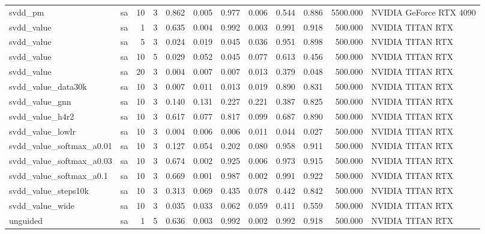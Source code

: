 \begin{tabular}{llrrrrrrrrrl}
svdd_pm & sa & 10 & 3 & 0.862 & 0.005 & 0.977 & 0.006 & 0.544 & 0.886 & 5500.000 & NVIDIA GeForce RTX 4090 \\
svdd_value & sa & 1 & 3 & 0.635 & 0.004 & 0.992 & 0.003 & 0.991 & 0.918 & 500.000 & NVIDIA TITAN RTX \\
svdd_value & sa & 5 & 3 & 0.024 & 0.019 & 0.045 & 0.036 & 0.951 & 0.898 & 500.000 & NVIDIA TITAN RTX \\
svdd_value & sa & 10 & 5 & 0.029 & 0.052 & 0.045 & 0.077 & 0.613 & 0.456 & 500.000 & NVIDIA TITAN RTX \\
svdd_value & sa & 20 & 3 & 0.004 & 0.007 & 0.007 & 0.013 & 0.379 & 0.048 & 500.000 & NVIDIA TITAN RTX \\
svdd_value_data30k & sa & 10 & 3 & 0.007 & 0.011 & 0.013 & 0.019 & 0.890 & 0.831 & 500.000 & NVIDIA TITAN RTX \\
svdd_value_gnn & sa & 10 & 3 & 0.140 & 0.131 & 0.227 & 0.221 & 0.387 & 0.825 & 500.000 & NVIDIA TITAN RTX \\
svdd_value_h4r2 & sa & 10 & 3 & 0.617 & 0.077 & 0.817 & 0.099 & 0.687 & 0.890 & 500.000 & NVIDIA TITAN RTX \\
svdd_value_lowlr & sa & 10 & 3 & 0.004 & 0.006 & 0.006 & 0.011 & 0.044 & 0.027 & 500.000 & NVIDIA TITAN RTX \\
svdd_value_softmax_a0.01 & sa & 10 & 3 & 0.127 & 0.054 & 0.202 & 0.080 & 0.958 & 0.911 & 500.000 & NVIDIA TITAN RTX \\
svdd_value_softmax_a0.03 & sa & 10 & 3 & 0.674 & 0.002 & 0.925 & 0.006 & 0.973 & 0.915 & 500.000 & NVIDIA TITAN RTX \\
svdd_value_softmax_a0.1 & sa & 10 & 3 & 0.669 & 0.001 & 0.987 & 0.002 & 0.991 & 0.922 & 500.000 & NVIDIA TITAN RTX \\
svdd_value_steps10k & sa & 10 & 3 & 0.313 & 0.069 & 0.435 & 0.078 & 0.442 & 0.842 & 500.000 & NVIDIA TITAN RTX \\
svdd_value_wide & sa & 10 & 3 & 0.035 & 0.033 & 0.062 & 0.059 & 0.411 & 0.559 & 500.000 & NVIDIA TITAN RTX \\
unguided & sa & 1 & 5 & 0.636 & 0.003 & 0.992 & 0.002 & 0.992 & 0.918 & 500.000 & NVIDIA TITAN RTX \\
\bottomrule
\end{tabular}
